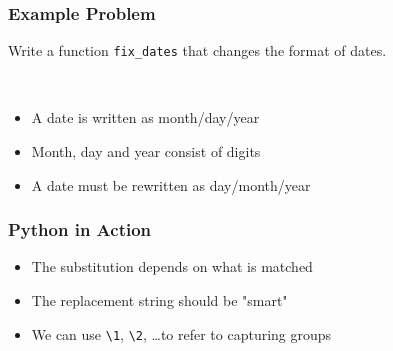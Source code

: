 \begin{frame}
  \frametitle{Example Problem}
  \begin{center}
    Write a function \texttt{fix\_dates} that changes the format of dates.
  \end{center}
  \vskip5mm
  \\[2mm]
  \begin{itemize}
    \item A date is written as month/day/year
    \item Month, day and year consist of digits
    \item A date must be rewritten as day/month/year
  \end{itemize}
\end{frame}

\begin{frame}
  \frametitle{Python in Action}
  \begin{itemize}
    \item The substitution depends on what is matched
    \item The replacement string should be "smart"
    \item We can use \texttt{\textbackslash1}, \texttt{\textbackslash2}, \dots to refer to capturing groups
  \end{itemize}
\end{frame}